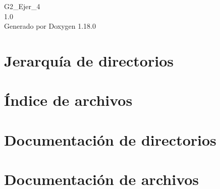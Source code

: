 \documentclass[twoside]{book}
\newcommand{\+}{\discretionary{\mbox{\scriptsize$\hookleftarrow$}}{}{}}
\newcommand{\clearemptydoublepage}{%
    \newpage{\pagestyle{empty}\cleardoublepage}%
  }
\begin{document}
  \raggedbottom
    \hypersetup{pageanchor=false,
                bookmarksnumbered=true,
                pdfencoding=unicode
               }
  \begin{titlepage}
  \vspace*{7cm}
  \begin{center}%
  {\Large G2\+\_\+\+Ejer\+\_\+4}\\
  [1ex]\large 1.\+0 \\
  \vspace*{1cm}
  {\large Generado por Doxygen 1.18.0}\\
  \end{center}
  \end{titlepage}
  \clearemptydoublepage
  \tableofcontents
  \clearemptydoublepage
  \hypersetup{pageanchor=true}

\chapter{Jerarquía de directorios}

\chapter{Índice de archivos}

\chapter{Documentación de directorios}




\chapter{Documentación de archivos}


  \backmatter
  \newpage
  \clearemptydoublepage
  \printindex
\end{document}
